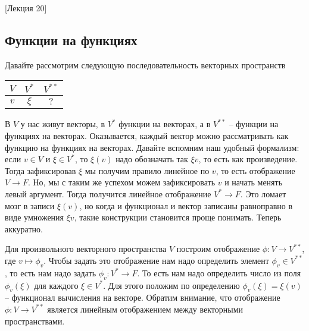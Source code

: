 [Лекция 20]



\subsection{Функции на функциях}

Давайте рассмотрим следующую последовательность векторных пространств
\begin{center}
\begin{tabular}{c|c|c}

{$V$}&{$V^*$}&{$V^{**}$}\\

\hline

{$v$}&{$\xi$}&{$?$}\\

\end{tabular}
\end{center}
В $V$ у нас живут векторы, в $V^*$ функции на векторах, а в $V^{**}$ -- функции на функциях на векторах. Оказывается, каждый вектор можно рассматривать как функцию на функциях на векторах. Давайте вспомним наш удобный формализм: если $v\in V$ и $\xi \in V^*$, то $\xi(v)$ надо обозначать так $\xi v$, то есть как произведение. Тогда зафиксировав $\xi$ мы получим правило линейное по $v$, то есть отображение $V\to F$. Но, мы с таким же успехом можем зафиксировать $v$ и начать менять левый аргумент. Тогда получится линейное отображение $V^* \to F$. Это ломает мозг в записи $\xi(v)$, но когда и функционал и вектор записаны равноправно в виде умножения $\xi v$, такие конструкции становится проще понимать. Теперь аккуратно.

Для произвольного векторного пространства $V$ построим отображение $\phi\colon V\to V^{**}$, где $v\mapsto \phi_v$. Чтобы задать это отображение нам надо определить элемент $\phi_v\in V^{**}$, то есть нам надо задать $\phi_v\colon V^*\to F$. То есть нам надо определить число из поля $\phi_v(\xi)$ для каждого $\xi\in V^*$. Для этого положим по определению $\phi_v(\xi) = \xi(v)$ -- функционал вычисления на векторе. Обратим внимание, что отображение $\phi\colon V\to V^{**}$ является линейным отображением между векторными пространствами.


